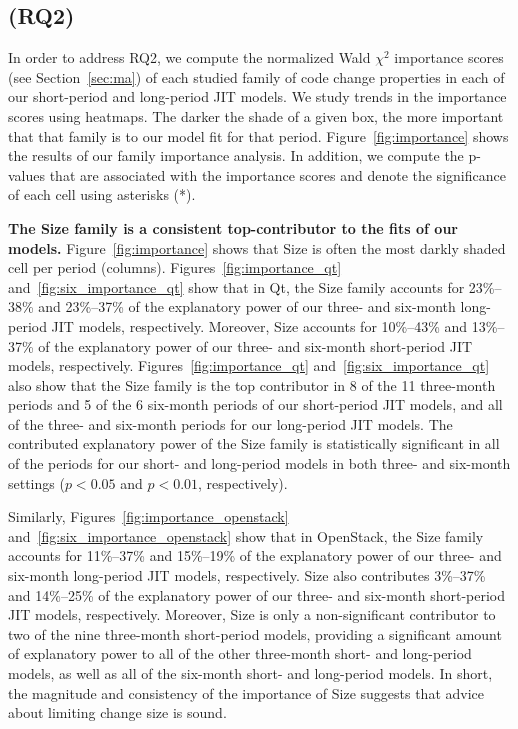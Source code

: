 \subsection*{(RQ2) \rqii}

In order to address RQ2, we compute the normalized Wald $\chi^2$ importance scores (see Section~\ref{sec:ma}) of each studied family of code change properties in each of our short-period and long-period JIT models.
We study trends in the importance scores using heatmaps.
The darker the shade of a given box, the more important that that family is to our model fit for that period.
Figure~\ref{fig:importance} shows the results of our family importance analysis.
In addition, we compute the p-values that are associated with the importance scores and denote the significance of each cell using asterisks (*).

\textbf{The Size family is a consistent top-contributor to the fits of our models.}
Figure~\ref{fig:importance} shows that Size is often the most darkly shaded cell per period (columns).
Figures~\ref{fig:importance_qt} and~\ref{fig:six_importance_qt} show that in {\sc Qt}, the Size family accounts for 23\%--38\% and 23\%--37\% of the explanatory power of our three- and six-month long-period JIT models, respectively.
Moreover, Size accounts for 10\%--43\% and 13\%--37\% of the explanatory power of our three- and six-month short-period JIT models, respectively.
Figures~\ref{fig:importance_qt} and~\ref{fig:six_importance_qt} also show that the Size family is the top contributor in 8 of the 11 three-month periods and 5 of the 6 six-month periods of our short-period JIT models, and all of the three- and six-month periods for our long-period JIT models.
The contributed explanatory power of the Size family is statistically significant in all of the periods for our short- and long-period models in both three- and six-month settings ($p < 0.05$ and $p < 0.01$, respectively).

Similarly, Figures~\ref{fig:importance_openstack} and~\ref{fig:six_importance_openstack} show that in {\sc OpenStack}, the Size family accounts for 11\%--37\% and 15\%--19\% of the explanatory power of our three- and six-month long-period JIT models, respectively. 
Size also contributes 3\%--37\% and 14\%--25\% of the explanatory power of our three- and six-month short-period JIT models, respectively.
Moreover, Size is only a non-significant contributor to two of the nine three-month short-period models, providing a significant amount of explanatory power to all of the other three-month short- and long-period models, as well as all of the six-month short- and long-period models.
In short, the magnitude and consistency of the importance of Size suggests that advice about limiting change size is sound.

